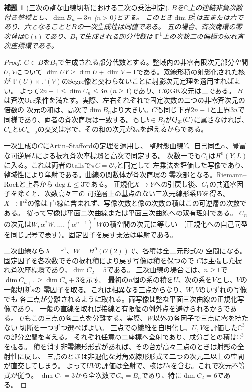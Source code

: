 \documentclass[11pt,a4paper]{ltjsarticle}
\newtheorem{lemma}[theorem]{補題}
\theoremstyle{definition}
\begin{document}
\begin{lemma}[三次の整な曲線切断における二次の乗法判定]
\label{lem:ou-quadratic-generation-test}
$B$を$\mathbb C$上の連結非負次数付き整域とし、$\dim B_n=3n$ ($n>0$)とする。
このとき$\dim B_1^2$は五または六であり、六となることと$B$の一次生成性は同値である。
五の場合、斉次商環の零次体は$\mathbb C(t)$であり、$B_1$で生成される部分代数は
$\mathbb P^1$上の次数二の偏極の捩れ斉次座標環である。
\end{lemma}
\begin{proof}
$C\subset B$を$B_1$で生成される部分代数とする。整域内の非零有限次元部分空間$U,V$について
$\dim UV\ge\dim U+\dim V-1$である。双線形積の射影化された核が
$\mathbb P(U)\times\mathbb P(V)$のSegre像と交わらないことに射影次元定理を適用すればよい。
よって$2n+1\le\dim C_n\le3n$ ($n\ge1$)であり、$C$のGK次元は二である。
$B$は斉次Ore条件を満たす。実際、左右それぞれで固定次数の二つの非零斉次元の倍数の
次元の和は、高次で$\dim B_n$より大きい。$C$も同じ下界$2n+1$と上界$3n$で
同様であり、両者の斉次商環は一致する。もし$b\in B_j$が$Q_{\rm gr}(C)$に属さなければ、
$C_n$と$b C_{n-j}$の交叉は零で、その和の次元が$3n$を超えるからである。

一次生成の$C$にArtin--Staffordの定理\cite[Theorem~0.2, Corollary~0.3]{AScurves1995}を適用し、
整射影曲線$Y$、自己同型$\alpha$、豊富な可逆層$L$による捩れ斉次座標環と高次で同定する。
次数一でも$C_1$は$H^0(Y,L)$に入る。これは両者のtailsで$\pi C=\mathcal O_Y$と同定して
左乗法を評価した写像であり、整域性により単射である。曲線の関数体が斉次商環の
零次部となる。Riemann--Rochと上界から$\deg L\le3$である。
正規化$X\to Y$への引戻し後、$C_1$の共通零因子を除くと、次数高々三の
可逆層上の基点のない三次元線形系$W$を得る。$X\to\mathbb P^2$の像は
直線に含まれず、写像次数と像の次数の積はこの可逆層の次数である。
従って写像は平面二次曲線または平面三次曲線への双有理射である。
$C_n$の次元は$W,\alpha^*W,\ldots,(\alpha^{n-1})^*W$の積空間の次元に等しい
（正規化への自己同型を同じ記号で表す）。固定因子を戻す乗法は単射である。

二次曲線なら$X=\mathbb P^1$、$W=H^0(\mathcal O(2))$で、各積は全二元形式の
空間になる。固定因子を各次数でその捩れ積により戻す写像は積を保つので
$C$は主張した捩れ斉次座標環であり、$\dim C_2=5$である。
三次曲線の場合には、$n\ge1$で$\dim C_{n+1}\ge\dim C_n+3$を示す。
最初の$n$個の系の積を$U$、次の系を$V$とし、$V$の一般切断$s$の
零因子を取る。これは相異なる三点からなり、$W,V$のいずれの写像でも
各二点が分離されるように取れる。両写像は整な平面三次曲線の正規化写像であり、
一般の直線を取れば接線と有限個の例外点を避けられるからである。
$U$もこの三点の各二点を分離する。実際、$W$以外の各因子で三点に零を持たない
切断を一つずつ選べばよい。
三点での繊維を自明化し、$U,V$を評価した$\mathbb C^3$の部分空間を考える。
それぞれ任意の二座標へ全射であり、成分ごとの積は$\mathbb C^3$を張る。
積を消す非零線形形式があれば、その台が高々二点のときは射影の全射性に反し、
三点のときは非退化な対角双線形形式で二つの次元二以上の空間が直交してしまう。
よって$UV$の評価は全射で、核は$Us$を含む。これで次元不等式が従う。
$\dim C_1=3$から全次数で$C_n=B_n$であり、特に$\dim C_2=6$である。
\end{proof}
\end{document}
